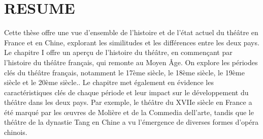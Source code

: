 \documentclass[UTF8,a4paper,12pt]{ctexart}
\numberwithin{equation}{section}
\begin{document}
\newpage
{}
\section*{RESUME}
\hspace{8mm}
Cette thèse offre une vue d'ensemble de l'histoire et de l'état actuel du théâtre en France et en Chine, explorant les similitudes et les différences entre les deux pays. Le chapitre I offre un aperçu de l'histoire du théâtre, en commençant par l'histoire du théâtre français, qui remonte au Moyen Âge. On explore les périodes clés du théâtre français, notamment le 17ème siècle, le 18ème siècle, le 19ème siècle et le 20ème siècle.. Le chapitre met également en évidence les caractéristiques clés de chaque période et leur impact sur le développement du théâtre dans les deux pays. Par exemple, le théâtre du XVIIe siècle en France a été marqué par les œuvres de Molière et de la Commedia dell'arte, tandis que le théâtre de la dynastie Tang en Chine a vu l'émergence de diverses formes d'opéra chinois.
\end{document}

